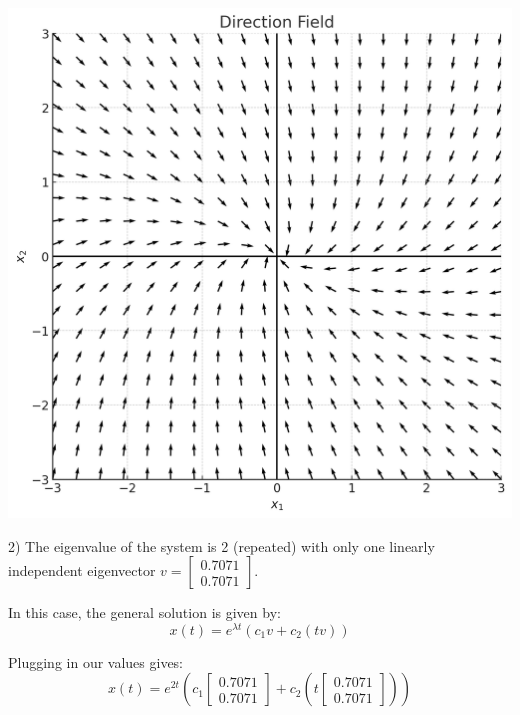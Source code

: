\documentclass{article}
\begin{document}
\includegraphics[width=\linewidth]{5_5_1_direction_field}


2) The eigenvalue of the system is 2 (repeated) with only one linearly
independent eigenvector $v = \begin{bmatrix}
    0.7071 \\
    0.7071
\end{bmatrix}$.

In this case, the general solution is given by:
\[x(t) = e^{\lambda t} (c_1 v + c_2 (t v))\]

Plugging in our values gives:
\[x(t) = e^{2t} (c_1 \begin{bmatrix}
    0.7071 \\
    0.7071
\end{bmatrix} + c_2 (t \begin{bmatrix}
    0.7071 \\
    0.7071
\end{bmatrix}))\]
\end{document}
